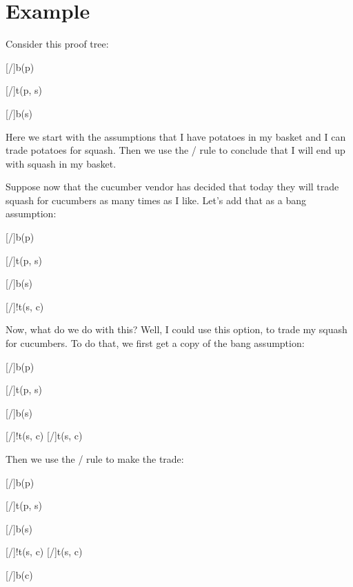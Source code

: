 \documentclass[../../../main.tex]{subfiles}
\begin{document}
\section{Example}

Consider this proof tree:

\begin{prooftree*}
  \hypo{}
  [\startrule/]{b(p)}
  
  \hypo{}
  [\startrule/]{t(p, s)}
  
  [\traderule/]{b(s)}
\end{prooftree*}

\noindent
Here we start with the assumptions that I have potatoes in my basket and I can trade potatoes for squash. Then we use the \traderule/ rule to conclude that I will end up with squash in my basket.

Suppose now that the cucumber vendor has decided that today they will trade squash for cucumbers as many times as I like. Let's add that as a bang assumption:

\begin{prooftree*}
  \hypo{}
  [\startrule/]{b(p)}
  
  \hypo{}
  [\startrule/]{t(p, s)}
  
  [\traderule/]{b(s)}
  
  \hypo{}
  [\startrule/]{!t(s, c)}
  
\end{prooftree*}

\noindent
Now, what do we do with this? Well, I could use this option, to trade my squash for cucumbers. To do that, we first get a copy of the bang assumption:

\begin{prooftree*}
  \hypo{}
  [\startrule/]{b(p)}
  
  \hypo{}
  [\startrule/]{t(p, s)}
  
  [\traderule/]{b(s)}
  
  \hypo{}
  [\startrule/]{!t(s, c)}
  [\bangCopy/]{t(s, c)}
  
\end{prooftree*}

\noindent
Then we use the \traderule/ rule to make the trade:

\begin{prooftree*}
  \hypo{}
  [\startrule/]{b(p)}
  
  \hypo{}
  [\startrule/]{t(p, s)}
  
  [\traderule/]{b(s)}
  
  \hypo{}
  [\startrule/]{!t(s, c)}
  [\bangCopy/]{t(s, c)}
  
  [\traderule/]{b(c)}
\end{prooftree*}
\end{document}
